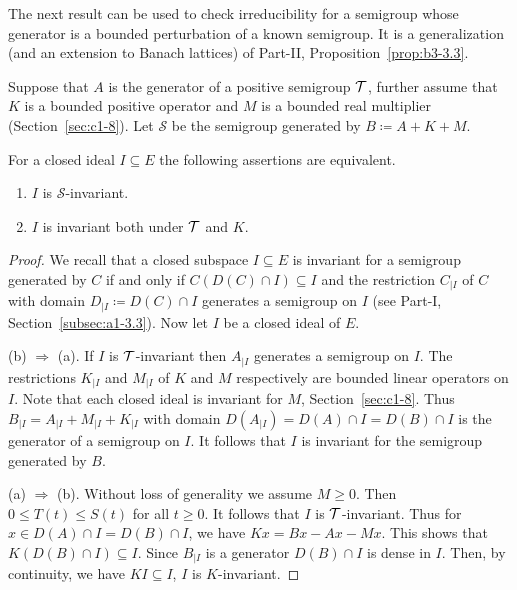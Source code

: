 
The next result can be used to check irreducibility for a semigroup whose generator is a bounded perturbation of a known semigroup. It is a generalization (and an extension to Banach lattices) of Part-II, Proposition~\ref{prop:b3-3.3}. 
\begin{proposition}\label{prop:c3-3.3}
	Suppose that $A$ is the generator of a positive semigroup $\mathcal{T}$, further assume that $K$ is a bounded positive operator and $M$ is a bounded real multiplier (\cf Section~\ref{sec:c1-8}).
	Let $\mathcal{S}$ be the semigroup generated by $B \coloneq A + K + M$.
	
	For a closed ideal $I \subseteq E$ the following assertions are equivalent.
	\begin{enumerate}[\upshape (a)]
		\item 
		$I$ is $\mathcal{S}$-invariant.
	
		\item 
		$I$ is invariant both under $\mathcal{T}$ and $K$.
	\end{enumerate}
\end{proposition}
\begin{proof}
We recall that a closed subspace $I \subseteq E$ is invariant for a semigroup generated by $C$ if and only if\/ $C(D(C)\cap I) \subseteq I$ and the restriction $C_{|I}$ of\/ $C$ with domain $D_{|I} \coloneq D(C)\cap I$ generates a semigroup on $I$ (see Part-I, Section~\ref{subsec:a1-3.3}).
Now let $I$ be a closed ideal of\/ $E$.

(b) $\Rightarrow$ (a).
If\/ $I$ is $\mathcal{T}$-invariant then $A_{|I}$ generates a semigroup on $I$.
The restrictions $K_{|I}$ and $M_{|I}$ of\/ $K$ and $M$ respectively are bounded linear operators on $I$.
Note that each closed ideal is invariant for $M$, \cf Section~\ref{sec:c1-8}.
Thus $B_{|I} = A_{|I} + M_{|I} + K_{|I}$ with domain $D(A_{|I}) = D(A)\cap I = D(B)\cap I$ is the generator of a semigroup on $I$.
It follows that $I$ is invariant for the semigroup generated by $B$.

(a) $\Rightarrow$ (b).
Without loss of generality we assume $M \geq 0$.
Then $0 \leq T(t) \leq S(t)$ for all $t \geq 0$.
It follows that $I$ is $\mathcal{T}$-invariant.
Thus for $x \in D(A)\cap I = D(B)\cap I$, we have $Kx = Bx - Ax - Mx$.
This shows that $K(D(B)\cap I) \subseteq I$.
Since $B_{\vert I}$ is a generator $D(B)\cap I$ is dense in $I$.
Then, by continuity, we have $KI \subseteq I$, \ie  $I$ is $K$-invariant.
\end{proof}
